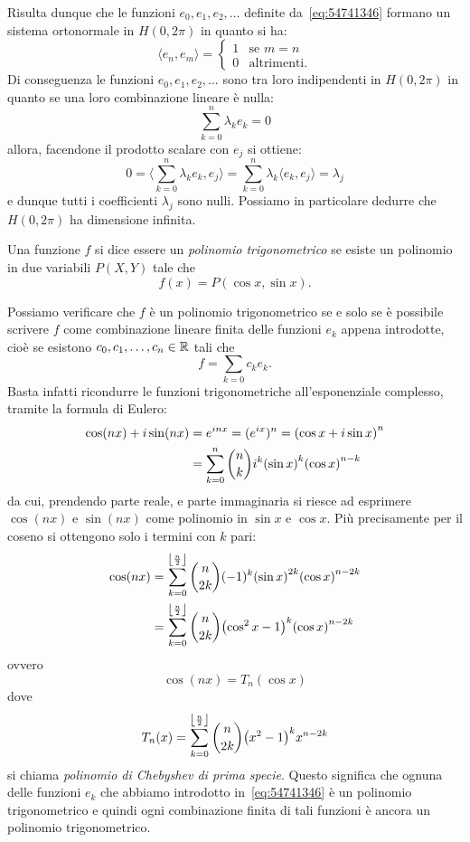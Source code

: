 Risulta dunque che le funzioni $e_0,e_1,e_2,\dots$ definite da~\eqref{eq:54741346}
formano un sistema ortonormale in $H(0,2\pi)$
in quanto si ha:
\[
  \langle e_n, e_m \rangle =
  \begin{cases} 1 &\text{se $m=n$}\\
  0 & \text{altrimenti}.
  \end{cases}
\]
Di conseguenza le funzioni $e_0,e_1,e_2, \dots$ sono tra loro indipendenti
in $H(0,2\pi)$ in quanto se una loro combinazione lineare è nulla:
\[
  \sum_{k=0}^n \lambda_k e_k = 0
\]
allora, facendone il prodotto scalare con $e_j$ si ottiene:
\[
  0 = \langle \sum_{k=0}^n \lambda_k e_k , e_j\rangle
  = \sum_{k=0}^n \lambda_k \langle e_k, e_j\rangle
  = \lambda_j
\]
e dunque tutti i coefficienti $\lambda_j$ sono nulli.
Possiamo in particolare dedurre che $H(0,2\pi)$ ha dimensione
infinita.

\begin{definition}
Una funzione $f$ si dice essere un \emph{polinomio trigonometrico}%
se esiste un polinomio in due variabili $P(X,Y)$ tale che
\[
  f(x) = P(\cos x, \sin x).
\]
\end{definition}

Possiamo verificare che $f$ è un polinomio trigonometrico se e solo se
è possibile scrivere $f$ come combinazione lineare finita delle funzioni $e_k$
appena introdotte,
cioè se esistono $c_0, c_1, \dots, c_n\in {\mathbb R}$ tali che
\[
  f = \sum_{k=0} c_k e_k.
\]
Basta infatti ricondurre le funzioni trigonometriche all'esponenziale complesso,
tramite la formula di Eulero:
\begin{align*}
   \cos(nx) + i \sin(nx)
   &= e^{inx} = (e^{ix})^n
   = {\left( \cos x + i \sin x \right)}^n\\
   &= \sum_{k=0}^n {n \choose k} i^k {\left( \sin x \right)}^k {\left( \cos x \right)}^{n-k}
\end{align*}
da cui, prendendo parte reale, e parte immaginaria si
riesce ad esprimere $\cos(nx)$ e $\sin(nx)$ come polinomio in $\sin x$ e $\cos x$.
Più precisamente per il coseno
si ottengono solo i termini con $k$ pari:
\begin{align*}
\cos(nx) &= \sum_{k=0}^{\left\lfloor \frac n 2 \right\rfloor} {n \choose 2k} (-1)^k {\left( \sin x \right)}^{2k} {\left( \cos x \right)}^{n-2k}\\
&= \sum_{k=0}^{\left\lfloor \frac n 2 \right\rfloor}{n \choose 2k} {\left( \cos^2 x -1 \right)}^k {\left( \cos x \right)}^{n-2k}
\end{align*}
ovvero
\[
  \cos(nx) = T_n(\cos x)
\]
dove
\[
  T_n(x) = \sum_{k=0}^{\left\lfloor \frac n 2 \right\rfloor}{n \choose 2k} {\left( x^2 -1 \right)}^k x^{n-2k}
\]
si chiama \emph{polinomio di Chebyshev di prima specie}.
%
%
Questo significa che ognuna delle funzioni $e_k$ che abbiamo introdotto
in~\eqref{eq:54741346} è un polinomio trigonometrico e quindi ogni
combinazione finita di tali funzioni è ancora un polinomio trigonometrico.

